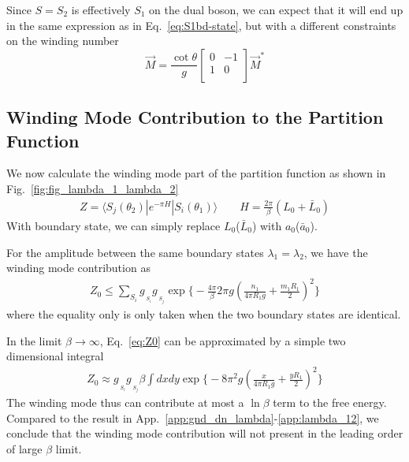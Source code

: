 Since $S = S_2$ is effectively $S_1$ on the dual boson, we can expect that it will end up in the same expression as in Eq.~\eqref{eq:S1bd-state}, but with a different constraints on the winding number
\begin{equation}
\vec{M} = \frac{\cot \theta}{g} 
\begin{bmatrix}
0 & -1\\
1 & 0 \\                                
\end{bmatrix}
\vec{M}^*
\end{equation}



\subsection{Winding Mode Contribution to the Partition Function}
\label{app_sub:winding_contribution}
We now calculate the winding mode part of the partition function as shown in Fig.~\ref{fig:fig_lambda_1_lambda_2}
\begin{equation}\begin{aligned}
Z=\langle S_j( \theta_2 )|e^{-\pi H}|S_i(\theta_1 )\rangle\qquad H=\frac{2\pi}{\beta}(L_0+\bar{L}_0)
\end{aligned}\end{equation}
With boundary state, we can simply replace $L_0$($\bar{L}_0$) with $a_0$($\bar{a}_0$). 

For the amplitude between the same boundary states $\lambda_1=\lambda_2$, we have the winding mode contribution as
\begin{equation}
\begin{aligned}
\label{eq:Z0}
Z_0 \le  \sum_{S_i} g_{\,\!_{S_i} }g_{\,\!_{S_j} } \exp\Big\{- \frac{4\pi}{\beta} 2 \pi g ( \frac{n_1}{ 4 \pi R_1 g} + \frac{m_1 R_1 }{ 2} )^2 \Big\}
\end{aligned}
\end{equation}
where the equality only is only taken when the two boundary states are identical. 

In the limit $\beta\rightarrow\infty$, Eq.~\eqref{eq:Z0} can be approximated by a simple two dimensional integral
\begin{equation}\begin{aligned}
Z_0\approx g_{\,\!_{S_i} }g_{\,\!_{S_j} }\beta\int dxdy\exp\Big\{-8 \pi^2 g ( \frac{x}{ 4 \pi R_1 g} + \frac{y R_1 }{ 2} )^2 \Big\}
\end{aligned}\end{equation}
The winding mode thus can contribute at most a $\ln\beta$ term to the free energy. Compared to the result in App.~\ref{app:gnd_dn_lambda}-\ref{app:lambda_12}, we conclude that the winding mode contribution will not present in the leading order of large $\beta$ limit. 


